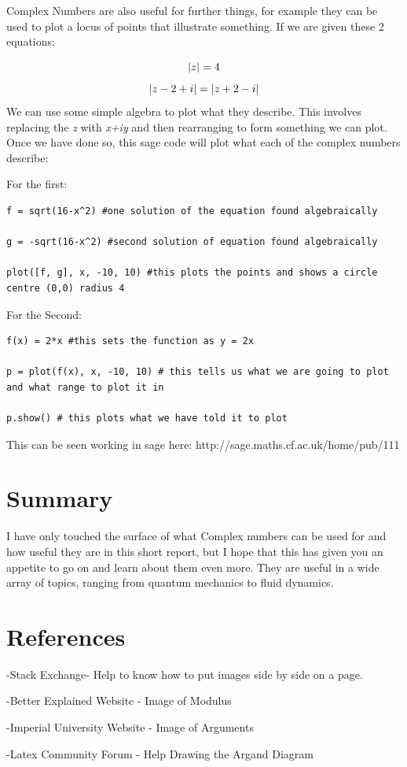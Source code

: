 Complex Numbers are also useful for further things, for example they can be used to plot a locus of points that illustrate something. If we are given these 2 equations:

\begin{equation}
|z| = 4 \nonumber\\
\end{equation}
\begin{equation}
|z-2+i| = |z+2-i|\nonumber\\
\end{equation}
We can use some simple algebra to plot what they describe. This involves replacing the \textit{z} with \textit{x+iy} and then rearranging to form something we can plot.
Once we have done so, this sage code will plot what each of the complex numbers describe:

For the first: 

\begin{verbatim}
f = sqrt(16-x^2) #one solution of the equation found algebraically

g = -sqrt(16-x^2) #second solution of equation found algebraically

plot([f, g], x, -10, 10) #this plots the points and shows a circle centre (0,0) radius 4
\end{verbatim}
For the Second:
\begin{verbatim}
f(x) = 2*x #this sets the function as y = 2x

p = plot(f(x), x, -10, 10) # this tells us what we are going to plot and what range to plot it in

p.show() # this plots what we have told it to plot
\end{verbatim}

This can be seen working in sage here: http://sage.maths.cf.ac.uk/home/pub/111 

\section{Summary}
I have only touched the surface of what Complex numbers can be used for and how useful they are in this short report, but I hope that this has given you an appetite to go on and learn about them even more. They are useful in a wide array of topics, ranging from quantum mechanics to fluid dynamics.
\scriptsize
\section{References}
-Stack Exchange- Help to know how to put images side by side on a page.

-Better Explained Website - Image of Modulus   

-Imperial University Website - Image of Arguments

-Latex Community Forum - Help Drawing the Argand Diagram